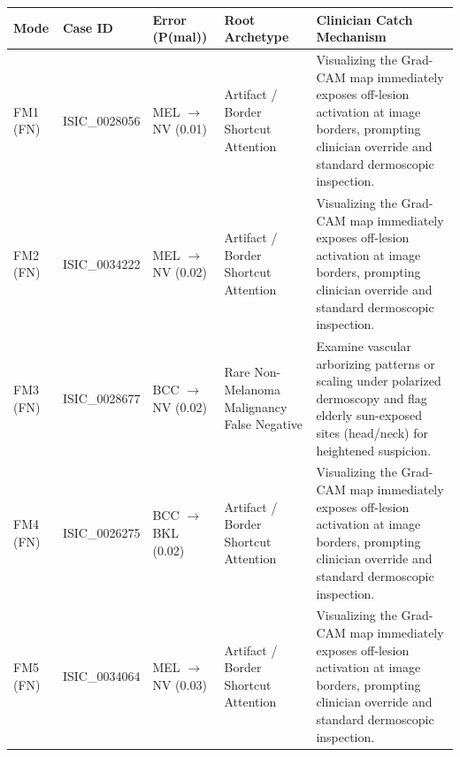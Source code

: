 \begin{tabular}{p{1.6cm}p{2.1cm}p{2.3cm}p{3.3cm}p{5.3cm}}
\toprule
\textbf{Mode} & \textbf{Case ID} & \textbf{Error (P(mal))} & \textbf{Root Archetype} & \textbf{Clinician Catch Mechanism} \\
\midrule
FM1 (FN) & ISIC\_0028056 & MEL $\to$ NV (0.01) & Artifact / Border Shortcut Attention & Visualizing the Grad-CAM map immediately exposes off-lesion activation at image borders, prompting clinician override and standard dermoscopic inspection. \\
FM2 (FN) & ISIC\_0034222 & MEL $\to$ NV (0.02) & Artifact / Border Shortcut Attention & Visualizing the Grad-CAM map immediately exposes off-lesion activation at image borders, prompting clinician override and standard dermoscopic inspection. \\
FM3 (FN) & ISIC\_0028677 & BCC $\to$ NV (0.02) & Rare Non-Melanoma Malignancy False Negative & Examine vascular arborizing patterns or scaling under polarized dermoscopy and flag elderly sun-exposed sites (head/neck) for heightened suspicion. \\
FM4 (FN) & ISIC\_0026275 & BCC $\to$ BKL (0.02) & Artifact / Border Shortcut Attention & Visualizing the Grad-CAM map immediately exposes off-lesion activation at image borders, prompting clinician override and standard dermoscopic inspection. \\
FM5 (FN) & ISIC\_0034064 & MEL $\to$ NV (0.03) & Artifact / Border Shortcut Attention & Visualizing the Grad-CAM map immediately exposes off-lesion activation at image borders, prompting clinician override and standard dermoscopic inspection. \\
\bottomrule
\end{tabular}

